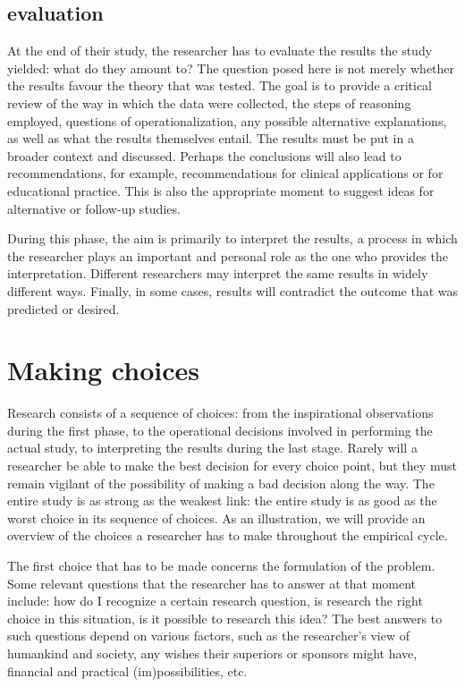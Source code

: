 \documentclass[
]{book}
\begin{document}
\subsection{evaluation}\label{evaluation}

At the end of their study, the researcher has to evaluate the results the study yielded: what do they amount to? The question posed here is not merely whether the results favour the theory that was tested. The goal is to provide a critical review of the way in which the data were collected, the steps of reasoning employed, questions of operationalization, any possible alternative explanations, as well as what the results themselves entail. The results must be put in a broader context and discussed. Perhaps the conclusions will also lead to recommendations, for example, recommendations for clinical applications or for educational practice. This is also the appropriate moment to suggest ideas for alternative or follow-up studies.

During this phase, the aim is primarily to interpret the results, a process in which the researcher plays an important and personal role as the one who provides the interpretation. Different researchers may interpret the same results in widely different ways. Finally, in some cases, results will contradict the outcome that was predicted or desired.

\section{Making choices}\label{sec:makingchoices}

Research consists of a sequence of choices: from the inspirational observations during the first phase, to the operational decisions involved in performing the actual study, to interpreting the results during the last stage. Rarely will a researcher be able to make the best decision for every choice point, but they must remain vigilant of the possibility of making a bad decision along the way. The entire study is as strong as the weakest link: the entire study is as good as the worst choice in its sequence of choices. As an illustration, we will provide an overview of the choices a researcher has to make throughout the empirical cycle.

The first choice that has to be made concerns the formulation of the problem. Some relevant questions that the researcher has to answer at that moment include: how do I recognize a certain research question, is research the right choice in this situation, is it possible to research this idea? The best answers to such questions depend on various factors, such as the researcher's view of humankind and society, any wishes their superiors or sponsors might have, financial and practical (im)possibilities, etc.
\end{document}
